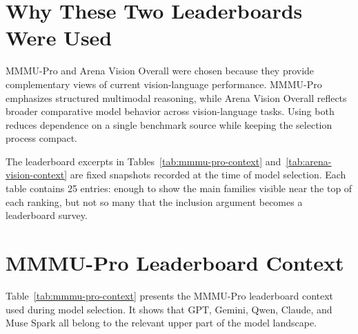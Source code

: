 \documentclass[11pt,a4paper]{report}
\begin{document}
\section{Why These Two Leaderboards Were Used}

MMMU-Pro and Arena Vision Overall were chosen because they provide complementary
views of current vision-language performance. MMMU-Pro emphasizes structured
multimodal reasoning, while Arena Vision Overall reflects broader comparative
model behavior across vision-language tasks. Using both reduces dependence on a
single benchmark source while keeping the selection process compact.

The leaderboard excerpts in Tables~\ref{tab:mmmu-pro-context}
and~\ref{tab:arena-vision-context} are fixed snapshots recorded at the time of
model selection. Each table contains 25 entries: enough to show the main
families visible near the top of each ranking, but not so many that the
inclusion argument becomes a leaderboard survey.

\section{MMMU-Pro Leaderboard Context}

Table~\ref{tab:mmmu-pro-context} presents the MMMU-Pro leaderboard context used
during model selection. It shows that GPT, Gemini, Qwen, Claude, and Muse Spark
all belong to the relevant upper part of the model landscape.
\end{document}
